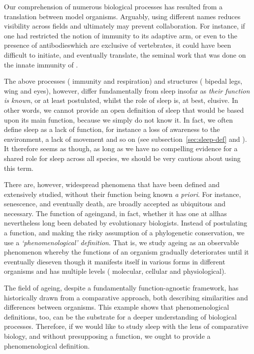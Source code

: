 Our comprehension of numerous biological processes has resulted from a translation between model organisms.
Arguably, using different names reduces visibility across fields and ultimately may prevent collaboration.
For instance, if one had restricted the notion of immunity to its adaptive arm, or even to the presence of antibodies\emd{}which are exclusive of vertebrates\cite{flajnik_origin_2010}\emd{}, it could have been difficult to initiate, and eventually translate, the seminal work that was done on the innate immunity of \dmel{}\cite{hoffmann_innate_1995}.

The above processes (\ie{} immunity and respiration) and
structures (\ie{} bipedal legs, wing and eyes), however, differ fundamentally from sleep 
insofar as \emph{their function is known}, or at least postulated,
whilst the role of sleep is, at best, elusive\cite{siegel_sleep_2009,joiner_unraveling_2016}.
In other words, we cannot provide an open definition of sleep that would  be based upon 
its main function, because we simply do not know it.
In fact, we often define sleep as a lack of function, for instance a loss of awareness to the environment, a lack of movement and so on (see subsection~\ref{sec:sleep-def} and \cite{campbell_animal_1984}). 
It therefore seems as though, as long as we have no compelling evidence for a shared role for sleep across all species, we should be very cautious about using this term.

There are, however, widespread phenomena that have been defined and extensively studied, without their function being known \emph{a priori}.
For instance, senescence, and eventually death, are broadly accepted as ubiquitous and necessary.
The function of ageing\emd{}and, in fact, whether it has one at all\emd{}has nevertheless long been debated by evolutionary biologists\cite{partridge_optimally_1993,hughes_evolutionary_2004,rose_evolution_2008}.
Instead of postulating a function, and making the risky assumption of a phylogenetic conservation, we use a \emph{`phenomenological' definition}.
That is, we study ageing as an observable phenomenon whereby the functions of an organism gradually deteriorates until it eventually dies\emd{}even
though it manifests itself in various forms in different organisms and has multiple levels (\ie{} molecular, cellular and physiological)\cite{johnson_molecular_1999,sun_mitochondrial_2016}.

The field of ageing, despite a fundamentally function-agnostic framework, 
has historically drawn from a comparative approach,
both describing similarities and differences between organisms\cite{hughes_evolutionary_2004,austad_comparative_2009}.
This example shows that phenomenological definitions, too, can be the substrate for a deeper understanding of biological processes.
Therefore, if we would like to study sleep with the lens of comparative biology, and without presupposing a function, we ought to provide a phenomenological definition.

